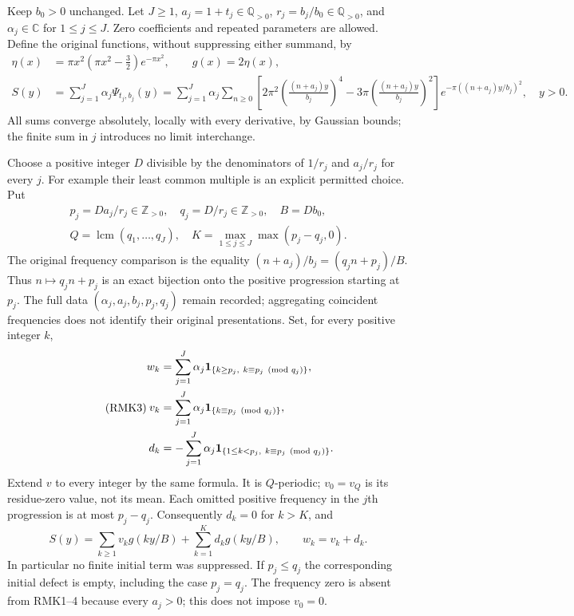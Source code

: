 \documentclass[11pt]{article}
\begin{document}
Keep $b_0>0$ unchanged. Let $J\geq1$, $a_j=1+t_j\in\mathbb Q_{>0}$,
$r_j=b_j/b_0\in\mathbb Q_{>0}$, and $\alpha_j\in\mathbb C$ for
$1\leq j\leq J$. Zero coefficients and repeated parameters are allowed.
Define the original functions, without suppressing either summand, by
{\small
\begin{equation}\tag{RMK1}
\begin{split}
 \eta(x)&=\pi x^2(\pi x^2-\tfrac32)e^{-\pi x^2},
 \qquad g(x)=2\eta(x),\\
 S(y)&=\sum_{j=1}^J\alpha_j\Psi_{t_j,b_j}(y)
   =\sum_{j=1}^J\alpha_j\sum_{n\geq0}
       \left[2\pi^2\left(\frac{(n+a_j)y}{b_j}\right)^4
             -3\pi\left(\frac{(n+a_j)y}{b_j}\right)^2\right]
           e^{-\pi((n+a_j)y/b_j)^2},\quad y>0.
\end{split}
\end{equation}
}
All sums converge absolutely, locally with every derivative, by
Gaussian bounds; the finite sum in $j$ introduces no limit interchange.

Choose a positive integer $D$ divisible by the denominators of
$1/r_j$ and $a_j/r_j$ for every $j$. For example their least common
multiple is an explicit permitted choice. Put
\begin{equation}\tag{RMK2}\begin{gathered}
 p_j=D a_j/r_j\in\mathbb Z_{>0},\quad
 q_j=D/r_j\in\mathbb Z_{>0},\quad B=D b_0,\\
 Q=\operatorname{lcm}(q_1,\ldots,q_J),\quad
 K=\max_{1\leq j\leq J}\max(p_j-q_j,0).
\end{gathered}
\end{equation}
The original frequency comparison is the equality
$(n+a_j)/b_j=(q_jn+p_j)/B$. Thus $n\mapsto q_jn+p_j$
is an exact bijection onto the positive progression starting at $p_j$.
The full data $(\alpha_j,a_j,b_j,p_j,q_j)$ remain recorded; aggregating
coincident frequencies does not identify their original presentations.
Set, for every positive integer $k$,
\begin{equation}\tag{RMK3}
\begin{split}
 w_k&=\sum_{j=1}^J\alpha_j
       {\bf1}_{\{k\geq p_j,\ k\equiv p_j\pmod{q_j}\}},\\
 v_k&=\sum_{j=1}^J\alpha_j
       {\bf1}_{\{k\equiv p_j\pmod{q_j}\}},\\
 d_k&=-\sum_{j=1}^J\alpha_j
       {\bf1}_{\{1\leq k<p_j,\ k\equiv p_j\pmod{q_j}\}}.
\end{split}
\end{equation}
Extend $v$ to every integer by the same formula. It is $Q$-periodic;
$v_0=v_Q$ is its residue-zero value, not its mean. Each omitted
positive frequency in the $j$th progression is at most $p_j-q_j$.
Consequently $d_k=0$ for $k>K$, and
\begin{equation}\tag{RMK4}
 S(y)=\sum_{k\geq1}v_k g(ky/B)+\sum_{k=1}^K d_k g(ky/B),
 \qquad w_k=v_k+d_k.
\end{equation}
In particular no finite initial term was suppressed. If $p_j\leq q_j$
the corresponding initial defect is empty, including the case
$p_j=q_j$. The frequency zero is absent from RMK1--4 because every
$a_j>0$; this does not impose $v_0=0$.
\end{document}
